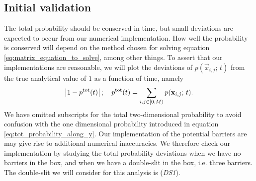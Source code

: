     \subsection{Initial validation}\label{sec:methods:sanity}

        The total probability should be conserved in time, but small deviations are expected to occur from our numerical implementation. How well the probability is conserved will depend on the method chosen for solving equation \eqref{eq:matrix_equation_to_solve}, among other things. To assert that our implementations are reasonable, we will plot the deviations of $p(\vec{x}_{i,j}; \, t)$ from the true analytical value of $1$ as a function of time, namely  
        \begin{equation}\label{eq:total_probability_deviation}
            \abs{1- p^\mathrm{tot}(t)}\,; \quad p^\mathrm{tot}(t) = \sum_{i,j\in [0, M)} p(\mathbf{x}_{i,j};\, t).
        \end{equation}
        We have omitted subscripts for the total two-dimensional probability to avoid confusion with the one dimensional probability introduced in equation \eqref{eq:tot_probability_along_y}. Our implementation of the potential barriers are may give rise to additional numerical inaccuracies. We therefore check our implementation by studying the total probability deviations when we have no barriers in the box, and when we have a double-slit in the box, i.e. three barriers. The double-slit we will consider for this analysis is (\textit{DS1}).  
